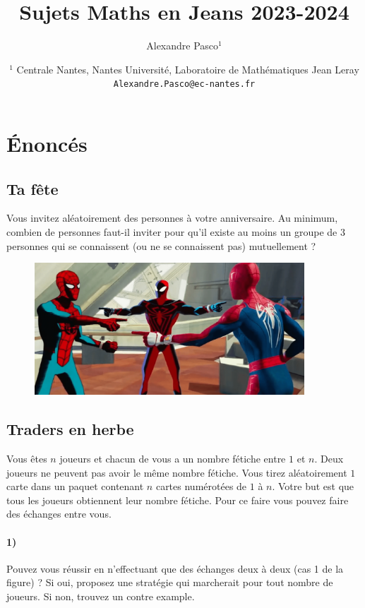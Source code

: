 \documentclass[a4paper,10pt,oneside]{article}
\title{Sujets Maths en Jeans 2023-2024}
\author{
  Alexandre Pasco${}^{1}$}
\date{\medskip%
  \small %
  ${}^1$  Centrale Nantes, Nantes Université, Laboratoire de Mathématiques Jean Leray\\
  \texttt{Alexandre.Pasco@ec-nantes.fr}
  }
\begin{document}
\maketitle

\section{Énoncés}

\subsection{Ta fête}
Vous invitez aléatoirement des personnes à votre anniversaire. 
Au minimum, combien de personnes faut-il inviter pour qu'il existe au moins un groupe de $3$ personnes qui se connaissent (ou ne se connaissent pas) mutuellement ? 

\begin{figure}[!ht]
  \centering
  \includegraphics[width=0.9\textwidth]{figures/fete.png}
\end{figure}

\subsection{Traders en herbe}

Vous êtes $n$ joueurs et chacun de vous a un nombre fétiche entre $1$ et $n$. 
Deux joueurs ne peuvent pas avoir le même nombre fétiche.
Vous tirez aléatoirement $1$ carte dans un paquet contenant $n$ cartes numérotées de $1$ à $n$. Votre but est que tous les joueurs obtiennent leur nombre fétiche.
Pour ce faire vous pouvez faire des échanges entre vous.

\paragraph*{1)} 
Pouvez vous réussir en n'effectuant que des échanges deux à deux (cas 1 de la figure) ? 
Si oui, proposez une stratégie qui marcherait pour tout nombre de joueurs.
Si non, trouvez un contre example.
\end{document}
